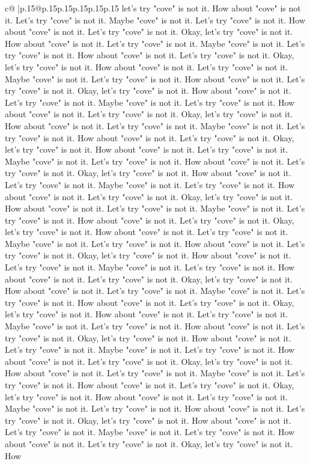 \documentclass{article}
\begin{document}
{\begin{supertabular}{c@{$\;$}|p{.15\linewidth}@{}p{.15\linewidth}p{.15\linewidth}p{.15\linewidth}p{.15\linewidth}p{.15\linewidth}}
{{{let's try "cove" is not it. How about "cove" is not it. Let's try "cove" is not it. Maybe "cove" is not it. Let's try "cove" is not it. How about "cove" is not it. Let's try "cove" is not it. Okay, let's try "cove" is not it. How about "cove" is not it. Let's try "cove" is not it. Maybe "cove" is not it. Let's try "cove" is not it. How about "cove" is not it. Let's try "cove" is not it. Okay, let's try "cove" is not it. How about "cove" is not it. Let's try "cove" is not it. Maybe "cove" is not it. Let's try "cove" is not it. How about "cove" is not it. Let's try "cove" is not it. Okay, let's try "cove" is not it. How about "cove" is not it. Let's try "cove" is not it. Maybe "cove" is not it. Let's try "cove" is not it. How about "cove" is not it. Let's try "cove" is not it. Okay, let's try "cove" is not it. How about "cove" is not it. Let's try "cove" is not it. Maybe "cove" is not it. Let's try "cove" is not it. How about "cove" is not it. Let's try "cove" is not it. Okay, let's try "cove" is not it. How about "cove" is not it. Let's try "cove" is not it. Maybe "cove" is not it. Let's try "cove" is not it. How about "cove" is not it. Let's try "cove" is not it. Okay, let's try "cove" is not it. How about "cove" is not it. Let's try "cove" is not it. Maybe "cove" is not it. Let's try "cove" is not it. How about "cove" is not it. Let's try "cove" is not it. Okay, let's try "cove" is not it. How about "cove" is not it. Let's try "cove" is not it. Maybe "cove" is not it. Let's try "cove" is not it. How about "cove" is not it. Let's try "cove" is not it. Okay, let's try "cove" is not it. How about "cove" is not it. Let's try "cove" is not it. Maybe "cove" is not it. Let's try "cove" is not it. How about "cove" is not it. Let's try "cove" is not it. Okay, let's try "cove" is not it. How about "cove" is not it. Let's try "cove" is not it. Maybe "cove" is not it. Let's try "cove" is not it. How about "cove" is not it. Let's try "cove" is not it. Okay, let's try "cove" is not it. How about "cove" is not it. Let's try "cove" is not it. Maybe "cove" is not it. Let's try "cove" is not it. How about "cove" is not it. Let's try "cove" is not it. Okay, let's try "cove" is not it. How about "cove" is not it. Let's try "cove" is not it. Maybe "cove" is not it. Let's try "cove" is not it. How about "cove" is not it. Let's try "cove" is not it. Okay, let's try "cove" is not it. How about "cove" is not it. Let's try "cove" is not it. Maybe "cove" is not it. Let's try "cove" is not it. How about "cove" is not it. Let's try "cove" is not it. Okay, let's try "cove" is not it. How about "cove" is not it. Let's try "cove" is not it. Maybe "cove" is not it. Let's try "cove" is not it. How about "cove" is not it. Let's try "cove" is not it. Okay, let's try "cove" is not it. How about "cove" is not it. Let's try "cove" is not it. Maybe "cove" is not it. Let's try "cove" is not it. How about "cove" is not it. Let's try "cove" is not it. Okay, let's try "cove" is not it. How about "cove" is not it. Let's try "cove" is not it. Maybe "cove" is not it. Let's try "cove" is not it. How about "cove" is not it. Let's try "cove" is not it. Okay, let's try "cove" is not it. How }}}
\end{supertabular}}
\end{document}
